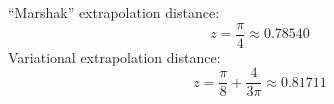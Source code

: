 \clearpage

``Marshak'' extrapolation distance:
\begin{equation*}
  z = \frac{\pi}{4} \approx 0.78540
\end{equation*}
Variational extrapolation distance:
\begin{equation*}
  z = \frac{\pi}{8} + \frac{4}{3\pi} \approx 0.81711
\end{equation*}


